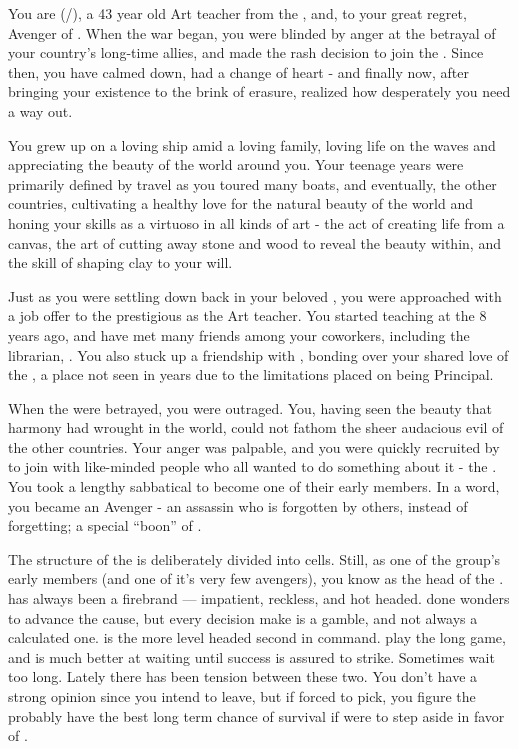 \documentclass[char]{GL2020}
\begin{document}
\name{\cChupAvenger{}}


You are \cChupAvenger{\full} (\cChupAvenger{\they}/\cChupAvenger{\them}), a 43 year old Art teacher from the \pShip{}, and, to your great regret, Avenger of \cGenesis{}. When the war began, you were blinded by anger at the betrayal of your country's long-time allies, and made the rash decision to join the \pGoaties{}. Since then, you have calmed down, had a change of heart - and finally now, after bringing your existence to the brink of erasure, realized how desperately you need a way out.

You grew up on a loving ship amid a loving family, loving life on the waves and appreciating the beauty of the world around you. Your teenage years were primarily defined by travel as you toured many boats, and eventually, the other countries, cultivating a healthy love for the natural beauty of the world and honing your skills as a virtuoso in all kinds of art - the act of creating life from a canvas, the art of cutting away stone and wood to reveal the beauty within, and the skill of shaping clay to your will. 

Just as you were settling down back in your beloved \pShip{}, you were approached with a job offer to the prestigious \pSchool{} as the Art teacher. You started teaching at the \pSc{} 8 years ago, and have met many friends among your coworkers, including the librarian, \cLibrarian{\full}. You also stuck up a friendship with \cPrincipal{\full}, bonding over your shared love of the \pShippies{}, a place \cPrincipal{\they} \cPrincipal{\have} not seen in years due to the limitations placed on being Principal.

When the \pShip{} were betrayed, you were outraged. You, having seen the beauty that harmony had wrought in the world, could not fathom the sheer audacious evil of the other countries. Your anger was palpable, and you were quickly recruited by \cChupSecond{\full} to join with like-minded people who all wanted to do something about it - the \pGoaties{}. You took a lengthy sabbatical to become one of their early members. In a word, you became an Avenger - an assassin who is forgotten by others, instead of forgetting; a special ``boon'' of \cGenesis{}.

The structure of the \pGoaties{} is deliberately divided into cells. Still, as one of the group's early members (and one of it's very few avengers), you know \cChupLeader{\full} as the head of the \pGoaties{}. \cChupLeader{} has always been a firebrand — impatient, reckless, and hot headed. \cChupLeader{\They} \cChupLeader{\have} done wonders to advance the \pGoaties{} cause, but every decision \cChupLeader{\they} make\cChupLeader{\plural} is a gamble, and not always a calculated one. \cChupSecond{} is the more level headed second in command. \cChupSecond{\They} play\cChupSecond{\plural} the long game, and is much better at waiting until success is assured to strike. Sometimes \cChupSecond{\they} wait too long. Lately there has been tension between these two. You don't have a strong opinion since you intend to leave, but if forced to pick, you figure the \pGoaties{} probably have the best long term chance of survival if \cChupLeader{} were to step aside in favor of \cChupSecond{}. 
\end{document}
